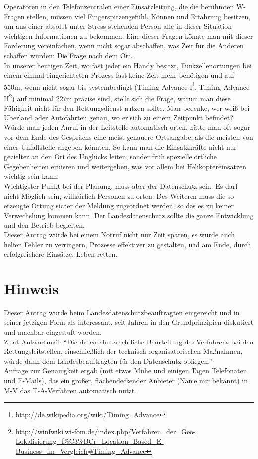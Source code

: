 Operatoren in den Telefonzentralen einer Einsatzleitung, die die berühmten W-Fragen stellen, müssen viel Fingerspitzengefühl, Können und Erfahrung besitzen, um aus einer absolut unter Stress stehenden Person alle in dieser Situation wichtigen Informationen zu bekommen. Eine dieser Fragen könnte man mit dieser Forderung vereinfachen, wenn nicht sogar abschaffen, was Zeit für die Anderen schaffen würden: Die Frage nach dem Ort.\\In unserer heutigen Zeit, wo fast jeder ein Handy besitzt, Funkzellenortungen bei einem einmal eingerichteten Prozess fast keine Zeit mehr benötigen und auf 550m, wenn nicht sogar bis systembedingt (Timing Advance I\footnote{\url{http://de.wikipedia.org/wiki/Timing\_Advance}}, Timing Advance II\footnote{\url{http://winfwiki.wi-fom.de/index.php/Verfahren\_der\_Geo-Lokalisierung\_f\%C3\%BCr\_Location\_Based\_E-Business\_im\_Vergleich\#Timing\_Advance}}) auf minimal 227m präzise sind, stellt sich die Frage, warum man diese Fähigkeit nicht für den Rettungsdienst nutzen sollte. Man bedenke, wer weiß bei Überland oder Autofahrten genau, wo er sich zu einem Zeitpunkt befindet?\\Würde man jeden Anruf in der Leitstelle automatisch orten, hätte man oft sogar vor dem Ende des Gesprächs eine meist genauere Ortsangabe, als die meisten von einer Unfallstelle angeben könnten. So kann man die Einsatzkräfte nicht nur gezielter an den Ort des Unglücks leiten, sonder früh spezielle örtliche Gegebenheiten eruieren und weitergeben, was vor allem bei Helikoptereinsätzen wichtig sein kann.\\Wichtigster Punkt bei der Planung, muss aber der Datenschutz sein. Es darf nicht Möglich sein, willkürlich Personen zu orten. Des Weiteren muss die so erzeugte Ortung sicher der Meldung zugeordnet werden, so das es zu keiner Verwechslung kommen kann. Der Landesdatenschutz sollte die ganze Entwicklung und den Betrieb begleiten.\\Dieser Antrag würde bei einem Notruf nicht nur Zeit sparen, es würde auch helfen Fehler zu verringern, Prozesse effektiver zu gestalten, und am Ende, durch erfolgreichere Einsätze, Leben retten.

\section{Hinweis}

Dieser Antrag wurde beim Landesdatenschutzbeauftragten eingereicht und in seiner jetzigen Form als interessant, seit Jahren in den Grundprinzipien diskutiert und machbar eingestuft worden.\\Zitat Antwortmail: ``Die datenschutzrechtliche Beurteilung des Verfahrens bei den Rettungsleitstellen, einschließlich der technisch-organisatorischen Maßnahmen, würde dann dem Landesbeauftragten für den Datenschutz obliegen.''\\Anfrage zur Genauigkeit ergab (mit etwas Mühe und einigen Tagen Telefonaten und E-Mails), das ein großer, flächendeckender Anbieter (Name mir bekannt) in M-V das T-A-Verfahren automatisch nutzt.
